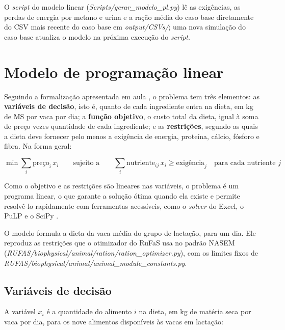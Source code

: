 \documentclass[a4paper,12pt]{article}
\begin{document}
O \textit{script} do modelo linear (\textit{Scripts/\allowbreak gerar\_\allowbreak modelo\_\allowbreak pl.py}) lê as exigências, as perdas de energia por metano e urina e a ração média do caso base diretamente do CSV mais recente do caso base em \textit{output/CSVs/}; uma nova simulação do caso base atualiza o modelo na próxima execução do \textit{script}.

\section{Modelo de programação linear}\label{sec:modelo}

Seguindo a formalização apresentada em aula \cite{slides:rufas}, o problema tem três elementos: as \textbf{variáveis de decisão}, isto é, quanto de cada ingrediente entra na dieta, em kg de MS por vaca por dia; a \textbf{função objetivo}, o custo total da dieta, igual à soma de preço vezes quantidade de cada ingrediente; e as \textbf{restrições}, segundo as quais a dieta deve fornecer pelo menos a exigência de energia, proteína, cálcio, fósforo e fibra. Na forma geral:

\begin{equation*}
    \min \sum_i \text{preço}_i\, x_i \qquad \text{sujeito a} \qquad \sum_i \text{nutriente}_{ij}\, x_i \geq \text{exigência}_j \quad \text{para cada nutriente } j
\end{equation*}

Como o objetivo e as restrições são lineares nas variáveis, o problema é um programa linear, o que garante a solução ótima quando ela existe e permite resolvê-lo rapidamente com ferramentas acessíveis, como o \textit{solver} do Excel, o PuLP e o SciPy \cite{slides:rufas}.

O modelo formula a dieta da vaca média do grupo de lactação, para um dia. Ele reproduz as restrições que o otimizador do RuFaS usa no padrão NASEM (\textit{RUFAS/\allowbreak biophysical/\allowbreak animal/\allowbreak ration/\allowbreak ration\_\allowbreak optimizer.py}), com os limites fixos de \textit{RUFAS/\allowbreak biophysical/\allowbreak animal/\allowbreak animal\_\allowbreak module\_\allowbreak constants.py}.

\subsection{Variáveis de decisão}

A variável $x_i$ é a quantidade do alimento $i$ na dieta, em kg de matéria seca por vaca por dia, para os nove alimentos disponíveis às vacas em lactação:
\end{document}
